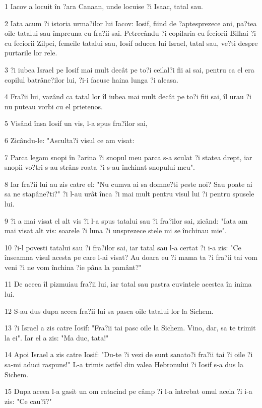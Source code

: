 \par 1 Iacov a locuit în ?ara Canaan, unde locuise ?i Isaac, tatal sau.
\par 2 Iata acum ?i istoria urma?ilor lui Iacov: Iosif, fiind de ?aptesprezece ani, pa?tea oile tatalui sau împreuna cu fra?ii sai. Petrecându-?i copilaria cu feciorii Bilhai ?i cu feciorii Zilpei, femeile tatalui sau, Iosif aducea lui Israel, tatal sau, ve?ti despre purtarile lor rele.
\par 3 ?i iubea Israel pe Iosif mai mult decât pe to?i ceilal?i fii ai sai, pentru ca el era copilul batrâne?ilor lui, ?i-i facuse haina lunga ?i aleasa.
\par 4 Fra?ii lui, vazând ca tatal lor îl iubea mai mult decât pe to?i fiii sai, îl urau ?i nu puteau vorbi cu el prietenos.
\par 5 Visând însa Iosif un vis, l-a spus fra?ilor sai,
\par 6 Zicându-le: "Asculta?i visul ce am visat:
\par 7 Parca legam snopi în ?arina ?i snopul meu parca s-a sculat ?i statea drept, iar snopii vo?tri s-au strâns roata ?i s-au închinat snopului meu".
\par 8 Iar fra?ii lui au zis catre el: "Nu cumva ai sa domne?ti peste noi? Sau poate ai sa ne stapâne?ti?" ?i l-au urât înca ?i mai mult pentru visul lui ?i pentru spusele lui.
\par 9 ?i a mai visat el alt vis ?i l-a spus tatalui sau ?i fra?ilor sai, zicând: "Iata am mai visat alt vis: soarele ?i luna ?i unsprezece stele mi se închinau mie".
\par 10 ?i-l povesti tatalui sau ?i fra?ilor sai, iar tatal sau l-a certat ?i i-a zis: "Ce înseamna visul acesta pe care l-ai visat? Au doara eu ?i mama ta ?i fra?ii tai vom veni ?i ne vom închina ?ie pâna la pamânt?"
\par 11 De aceea îl pizmuiau fra?ii lui, iar tatal sau pastra cuvintele acestea în inima lui.
\par 12 S-au dus dupa aceea fra?ii lui sa pasca oile tatalui lor la Sichem.
\par 13 ?i Israel a zis catre Iosif: "Fra?ii tai pasc oile la Sichem. Vino, dar, sa te trimit la ei". Iar el a zis: "Ma duc, tata!"
\par 14 Apoi Israel a zis catre Iosif: "Du-te ?i vezi de sunt sanato?i fra?ii tai ?i oile ?i sa-mi aduci raspuns!" L-a trimis astfel din valea Hebronului ?i Iosif s-a dus la Sichem.
\par 15 Dupa aceea l-a gasit un om ratacind pe câmp ?i l-a întrebat omul acela ?i i-a zis: "Ce cau?i?"
